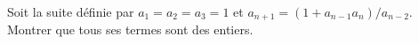Soit la suite définie par $a_1 = a_2 = a_3 = 1$ et $a_{n+1} = (1 + a_{n-1}a_n)/a_{n-2}$. Montrer que tous ses termes sont des entiers.
